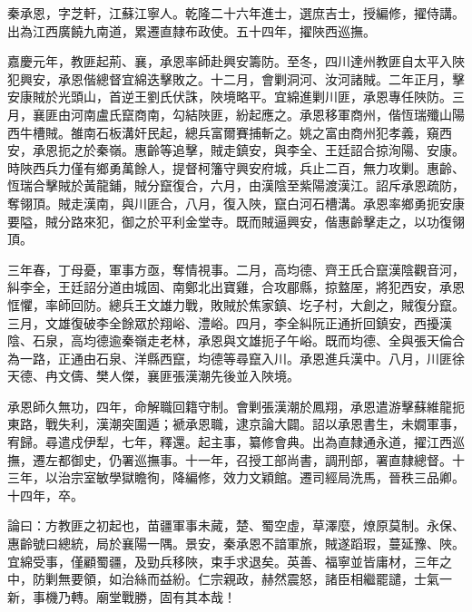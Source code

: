 \begin{pinyinscope}
秦承恩，字芝軒，江蘇江寧人。乾隆二十六年進士，選庶吉士，授編修，擢侍講。出為江西廣饒九南道，累遷直隸布政使。五十四年，擢陜西巡撫。

嘉慶元年，教匪起荊、襄，承恩率師赴興安籌防。至冬，四川達州教匪自太平入陜犯興安，承恩偕總督宜綿迭擊敗之。十二月，會剿洞河、汝河諸賊。二年正月，擊安康賊於光頭山，首逆王劉氏伏誅，陜境略平。宜綿進剿川匪，承恩專任陜防。三月，襄匪由河南盧氏竄商南，勾結陜匪，紛起應之。承恩移軍商州，偕恆瑞殲山陽西牛槽賊。雒南石板溝奸民起，總兵富爾賽捕斬之。姚之富由商州犯孝義，窺西安，承恩扼之於秦嶺。惠齡等追擊，賊走鎮安，與李全、王廷詔合掠洵陽、安康。時陜西兵力僅有鄉勇萬餘人，提督柯籓守興安府城，兵止二百，無力攻剿。惠齡、恆瑞合擊賊於黃龍鋪，賊分竄復合，六月，由漢陰至紫陽渡漢江。詔斥承恩疏防，奪翎頂。賊走漢南，與川匪合，八月，復入陜，竄白河石槽溝。承恩率鄉勇扼安康要隘，賊分路來犯，御之於平利金堂寺。既而賊逼興安，偕惠齡擊走之，以功復翎頂。

三年春，丁母憂，軍事方亟，奪情視事。二月，高均德、齊王氏合竄漢陰觀音河，糾李全，王廷詔分道由城固、南鄭北出寶雞，合攻郿縣，掠盩厔，將犯西安，承恩恇懼，率師回防。總兵王文雄力戰，敗賊於焦家鎮、圪子村，大創之，賊復分竄。三月，文雄復破李全餘眾於翔峪、澧峪。四月，李全糾阮正通折回鎮安，西擾漢陰、石泉，高均德逾秦嶺走老林，承恩與文雄扼子午峪。既而均德、全與張天倫合為一路，正通由石泉、洋縣西竄，均德等尋竄入川。承恩進兵漢中。八月，川匪徐天德、冉文儔、樊人傑，襄匪張漢潮先後並入陜境。

承恩師久無功，四年，命解職回籍守制。會剿張漢潮於鳳翔，承恩遣游擊蘇維龍扼東路，戰失利，漢潮突圍遁；褫承恩職，逮京論大闢。詔以承恩書生，未嫺軍事，宥歸。尋遣戍伊犁，七年，釋還。起主事，纂修會典。出為直隸通永道，擢江西巡撫，遷左都御史，仍署巡撫事。十一年，召授工部尚書，調刑部，署直隸總督。十三年，以治宗室敏學獄瞻徇，降編修，效力文穎館。遷司經局洗馬，晉秩三品卿。十四年，卒。

論曰：方教匪之初起也，苗疆軍事未蕆，楚、蜀空虛，草澤麼，燎原莫制。永保、惠齡號曰總統，局於襄陽一隅。景安，秦承恩不諳軍旅，賊遂蹈瑕，蔓延豫、陜。宜綿受事，僅顧蜀疆，及勁兵移陜，束手求退矣。英善、福寧並皆庸材，三年之中，防剿無要領，如治絲而益紛。仁宗親政，赫然震怒，諸臣相繼罷譴，士氣一新，事機乃轉。廟堂戰勝，固有其本哉！


\end{pinyinscope}